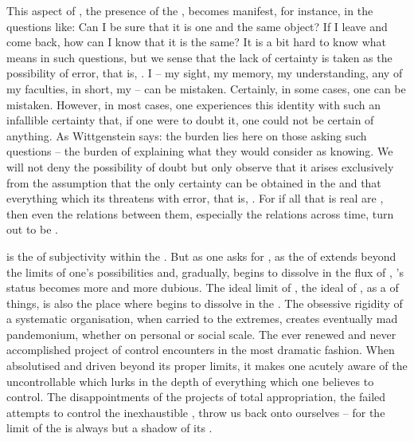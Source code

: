 This aspect of , the presence of the , becomes
manifest, for instance, in the questions like: Can I be sure that it is one and
the same object? If I leave and come back, how can I know that it is the same?
It is a bit hard to know what  means in such questions, but we sense
that the lack of  certainty is taken as the possibility of error,
that is, . I -- my sight, my memory, my understanding, any of
my faculties, in short, my  -- can be mistaken. Certainly, in some
cases, one can be mistaken. However, in most cases, one experiences this
identity with such an infallible certainty that, if one were to doubt it, one
could not be certain of anything. As Wittgenstein says: the burden lies here on
those asking such questions -- the burden of explaining what they would consider
as knowing.  We will not
deny the possibility of doubt but only observe that it arises exclusively from
the assumption that the only certainty can be obtained in the  and
that everything which  its   threatens
with error, that is, . For if all that is real are
, then even the relations between them, especially
the relations across time, turn out to be .

\pa {} is the  of subjectivity within the \hoa. But as one asks
for , as the  of  extends
beyond the limits of one's possibilities and, gradually, begins to dissolve in
the flux of , 's status becomes more and more dubious.  The
ideal limit of , the ideal  of ,  as a  of things, is also the place where  begins
to dissolve in the .  The obsessive rigidity of a
systematic organisation, when carried to the extremes, creates eventually mad
pandemonium, whether on personal or social scale.  The ever renewed and never
accomplished project of control encounters  in the most dramatic
fashion.  When absolutised and driven beyond its proper limits, it makes one
acutely aware of the uncontrollable  which lurks in the depth of
everything which one believes to control.  The disappointments of the projects
of total appropriation, the failed attempts to control the inexhaustible
, throw us back onto ourselves -- for the limit of the  is always but a shadow of its .

